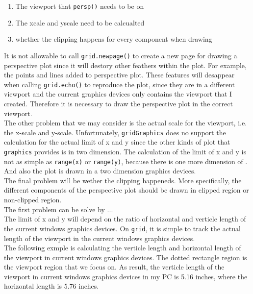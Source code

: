 \documentclass[paper=a4, fontsize=11pt]{report}
\begin{document}
\begin{enumerate}
  \item{The viewport that \texttt{persp()} needs to be on}
  \item{The xcale and yscale need to be calcualted}
  \item{whether the clipping happens for every component when drawing}
\end{enumerate}

It is not allowable to call \texttt{grid.newpage()} to create a new page for drawing a perspective plot since it will destory other feathers within the plot. For example, the points and lines added to perspective plot. These features will desappear when calling \texttt{grid.echo()} to reproduce the plot, since they are in a different viewport and the current graphics devices only contains the viewport that I created. Therefore it is necessary to draw the perspective plot in the correct viewport.\\

The other problem that we may consider is the actual scale for the viewport, i.e. the x-scale and y-scale. Unfortunately, \texttt{gridGraphics} does no support the calculation for the actual limit of x and y since the other kinds of plot that \texttt{graphics} provides is in two dimension. The calculation of the limit of x and y is not as simple as \texttt{range(x)} or \texttt{range(y)}, because there is one more dimension of . And also the plot is drawn in a two dimension graphics devices.\\

The final problem will be wether the clipping happeneds. More specifically, the different components of the perspective plot should be drawn in clipped region or non-clipped region. \\

The first problem can be solve by ...\\

The limit of x and y will depend on the ratio of horizontal and verticle length of the current windows graphics devices. On \texttt{grid}, it is simple to track the actual length of the viewport in the current windows graphics devices. \\

The following exmple is calculating the verticle length and horizontal length of the viewport in current windows graphics devices. The dotted rectangle region is the viewport region that we focus on. As result, the verticle length of the viewport in current windows graphics devices in my PC is 5.16 inches, where the horizontal length is 5.76 inches. \\
\end{document}
